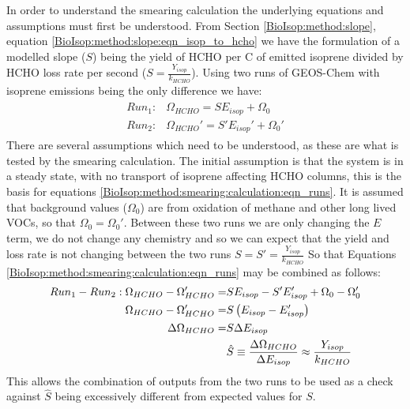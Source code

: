       In order to understand the smearing calculation the underlying equations and assumptions must first be understood.
      From Section \ref{BioIsop:method:slope}, equation \ref{BioIsop:method:slope:eqn_isop_to_hcho} we have the formulation of a modelled slope ($S$) being the yield of HCHO per C of emitted isoprene divided by HCHO loss rate per second ($S = \frac{Y_{isop}}{k_{HCHO}}$).
      Using two runs of GEOS-Chem with isoprene emissions being the only difference we have:
      \begin{eqnarray}
        \label{BioIsop:method:smearing:calculation:eqn_runs}
        \begin{split}
        Run_1 :&  \Omega_{HCHO} = S E_{isop} + \Omega_0 \\
        Run_2 :&  \Omega_{HCHO}' = S' E_{isop}' + \Omega_0' 
        \end{split}
      \end{eqnarray}
      There are several assumptions which need to be understood, as these are what is tested by the smearing calculation.
      The initial assumption is that the system is in a steady state, with no transport of isoprene affecting HCHO columns, this is the basis for equations \ref{BioIsop:method:smearing:calculation:eqn_runs}.
      It is assumed that background values ($\Omega_0$) are from oxidation of methane and other long lived VOCs, so that $\Omega_0 = \Omega_0'$.
      Between these two runs we are only changing the $E$ term, we do not change any chemistry and so we can expect that the yield and loss rate is not changing between the two runs $S = S' = \frac{Y_{isop}}{k_{HCHO}}$
      So that Equations \ref{BioIsop:method:smearing:calculation:eqn_runs} may be combined as follows:
      \begin{eqnarray}
        Run_1-Run_2 : \Omega_{HCHO} - \Omega_{HCHO}' = & S E_{isop} - S' E_{isop}' +\Omega_0 - \Omega_0' \notag \\
        \Omega_{HCHO} - \Omega_{HCHO}' = & S \left( E_{isop} - E_{isop}' \right) \notag \\
        \Delta \Omega_{HCHO} = & S \Delta E_{isop}  \notag \\
        & \hat{S} \equiv \frac{\Delta{\Omega_{HCHO}}}{\Delta E_{isop}} \approx \frac{Y_{isop}}{k_{HCHO}} \label{BioIsop:method:smearing:calculation:eqn_hats}
      \end{eqnarray}
      This allows the combination of outputs from the two runs to be used as a check against $\hat{S}$ being excessively different from expected values for $S$.
      
